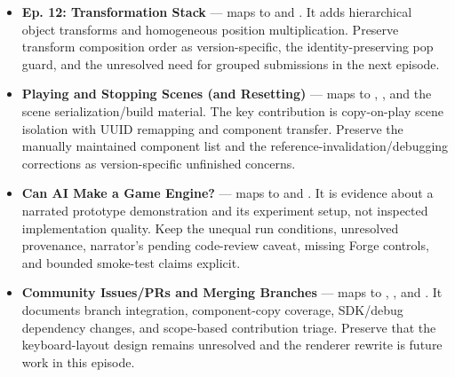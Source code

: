 \begin{itemize}
\item
  \textbf{Ep. 12: Transformation Stack} --- maps to  and . It adds hierarchical object transforms and homogeneous position multiplication. Preserve transform composition order as version-specific, the identity-preserving pop guard, and the unresolved need for grouped submissions in the next episode.
\item
  \textbf{Playing and Stopping Scenes (and Resetting)} --- maps to , , and the scene serialization/build material. The key contribution is copy-on-play scene isolation with UUID remapping and component transfer. Preserve the manually maintained component list and the reference-invalidation/debugging corrections as version-specific unfinished concerns.
\item
  \textbf{Can AI Make a Game Engine?} --- maps to  and . It is evidence about a narrated prototype demonstration and its experiment setup, not inspected implementation quality. Keep the unequal run conditions, unresolved provenance, narrator's pending code-review caveat, missing Forge controls, and bounded smoke-test claims explicit.
\item
  \textbf{Community Issues/PRs and Merging Branches} --- maps to , , and . It documents branch integration, component-copy coverage, SDK/debug dependency changes, and scope-based contribution triage. Preserve that the keyboard-layout design remains unresolved and the renderer rewrite is future work in this episode.

\end{itemize}

